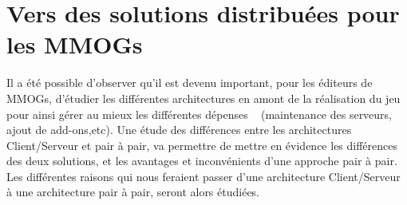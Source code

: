\section{Vers des solutions distribuées pour les MMOGs}
	\label{whyp2p}
	Il a été possible d'observer qu'il est devenu important, pour les éditeurs de MMOGs, d'étudier les différentes architectures en amont de la réalisation du jeu pour ainsi gérer au mieux les différentes dépenses ~\cite{14101410} (maintenance des serveurs, ajout de add-ons,etc). Une étude des différences entre les architectures Client/Serveur et pair à pair, va permettre de mettre en évidence les différences des deux solutions, et les avantages et inconvénients d'une approche pair à pair. Les différentes raisons qui nous feraient passer d'une architecture Client/Serveur à une architecture pair à pair, seront alors étudiées. 

